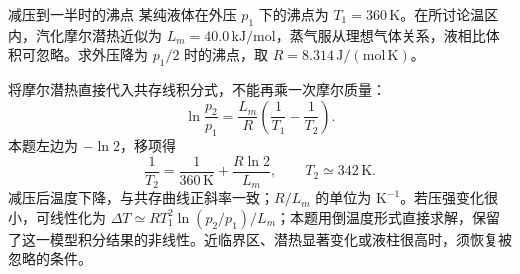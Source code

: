 \begin{origexamplebox}{减压到一半时的沸点}\label{ch17:ex:teaching-boiling}
某纯液体在外压 $p_1$ 下的沸点为 $T_1=360\,\mathrm K$。在所讨论温区内，汽化摩尔潜热近似为 $L_m=40.0\,\mathrm{kJ/mol}$，蒸气服从理想气体关系，液相比体积可忽略。求外压降为 $p_1/2$ 时的沸点，取 $R=8.314\,\mathrm{J/(mol\,K)}$。
\end{origexamplebox}
\begin{xesolution}
将摩尔潜热直接代入共存线积分式，不能再乘一次摩尔质量：
\[
 \ln\frac{p_2}{p_1}=\frac{L_m}{R}\left(\frac1{T_1}-\frac1{T_2}\right).
\]
本题左边为 $-\ln2$，移项得
\[
 \frac1{T_2}=\frac1{360\,\mathrm K}+\frac{R\ln2}{L_m},
 \qquad T_2\simeq342\,\mathrm K.
\]
减压后温度下降，与共存曲线正斜率一致；$R/L_m$ 的单位为 $\mathrm{K^{-1}}$。若压强变化很小，可线性化为 $\Delta T\simeq RT_1^2\ln(p_2/p_1)/L_m$；本题用倒温度形式直接求解，保留了这一模型积分结果的非线性。近临界区、潜热显著变化或液柱很高时，须恢复被忽略的条件。
\end{xesolution}
